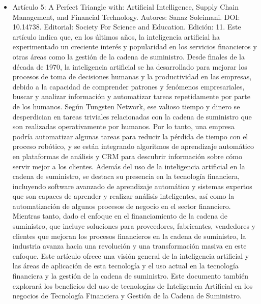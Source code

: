 \documentclass[conference]{IEEEtran}
\begin{document}
\begin{itemize}
		\item Artículo 5: A Perfect Triangle with: Artificial Intelligence, Supply Chain Management, and Financial Technology. Autores: Sanaz Soleimani. DOI: 10.14738. Editorial: Society For Science and Education. Edición: 11. 
		Este artículo indica que, en los últimos años, la inteligencia artificial ha experimentado un creciente interés y popularidad en los servicios financieros y otras áreas como la gestión de la cadena de suministro. Desde finales de la década de 1970, la inteligencia artificial se ha desarrollado para mejorar los procesos de toma de decisiones humanas y la productividad en las empresas, debido a la capacidad de comprender patrones y fenómenos empresariales, buscar y analizar información y automatizar tareas repetidamente por parte de los humanos. Según Tungsten Network, ese valioso tiempo y dinero se desperdician en tareas triviales relacionadas con la cadena de suministro que son realizadas operativamente por humanos. Por lo tanto, una empresa podría automatizar algunas tareas para reducir la pérdida de tiempo con el proceso robótico, y se están integrando algoritmos de aprendizaje automático en plataformas de análisis y CRM para descubrir información sobre cómo servir mejor a los clientes. Además del uso de la inteligencia artificial en la cadena de suministro, se destaca su presencia en la tecnología financiera, incluyendo software avanzado de aprendizaje automático y sistemas expertos que son capaces de aprender y realizar análisis inteligentes, así como la automatización de algunos procesos de negocio en el sector financiero. Mientras tanto, dado el enfoque en el financiamiento de la cadena de suministro, que incluye soluciones para proveedores, fabricantes, vendedores y clientes que mejoran los procesos financieros en la cadena de suministro, la industria avanza hacia una revolución y una transformación masiva en este enfoque. Este artículo ofrece una visión general de la inteligencia artificial y las áreas de aplicación de esta tecnología y el uso actual en la tecnología financiera y la gestión de la cadena de suministro. Este documento también explorará los beneficios del uso de tecnologías de Inteligencia Artificial en los negocios de Tecnología Financiera y Gestión de la Cadena de Suministro.
	\end{itemize}
\end{document}
